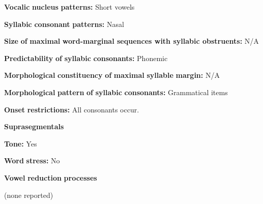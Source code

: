 \documentclass[output=paper]{langsci/langscibook}
\begin{document}
\begin{styleBody}
\textbf{Vocalic} \textbf{nucleus} \textbf{patterns:} Short vowels
\end{styleBody}

\begin{styleBody}
\textbf{Syllabic} \textbf{consonant} \textbf{patterns:} Nasal
\end{styleBody}

\begin{styleBody}
\textbf{Size} \textbf{of} \textbf{maximal} \textbf{word{}-marginal sequences with syllabic obstruents:} N/A
\end{styleBody}

\begin{styleBody}
\textbf{Predictability} \textbf{of} \textbf{syllabic} \textbf{consonants:} Phonemic
\end{styleBody}

\begin{styleBody}
\textbf{Morphological} \textbf{constituency} \textbf{of} \textbf{maximal} \textbf{syllable} \textbf{margin:} N/A
\end{styleBody}

\begin{styleBody}
\textbf{Morphological} \textbf{pattern} \textbf{of} \textbf{syllabic} \textbf{consonants:} Grammatical items
\end{styleBody}

\begin{styleBody}
\textbf{Onset} \textbf{restrictions:} All consonants occur.
\end{styleBody}

\begin{styleBody}
\textbf{Suprasegmentals}
\end{styleBody}

\begin{styleBody}
\textbf{Tone:} Yes
\end{styleBody}

\begin{styleBody}
\textbf{Word} \textbf{stress:} No
\end{styleBody}

\begin{styleBody}
\textbf{Vowel} \textbf{reduction} \textbf{processes}
\end{styleBody}

\begin{styleBody}
(none reported)
\end{styleBody}
\end{document}
